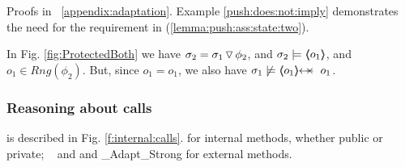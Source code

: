 {
Proofs %
 in \A\ \ref{appendix:adaptation}. Example \ref{push:does:not:imply}
 demonstrates the need for the     %
  requirement in  %
  (\ref{lemma:push:ass:state:two}). %
}



\begin{example}  
\label{push:does:not:imply}   
In  Fig. \ref{fig:ProtectedBoth} we have
 $\sigma_2= \PushSLong {\phi_2} {\sigma_1}$, and    $\sigma_2 \models \inside{o_1}$,  and $o_1\in Rng(\phi_2)$.
But, since $o_1=o_1$, we also have  $\sigma_1 \not\models \protectedFrom {o_1} {o_1}$.
%
% 
\end{example}






\subsubsection{Reasoning about   calls}
\label{s:calls}
is described in Fig. \ref{f:internal:calls}. {}  %
 for internal methods, whether public or private; \ %
and {} and {\_Adapt\_Strong} for  external methods.




